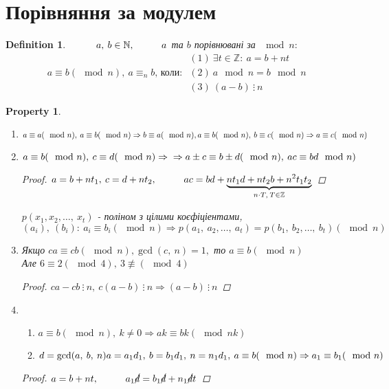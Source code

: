 \documentclass[a4paper,12pt]{bookest}
\newtheorem{definition}{Definition}[section]
\newtheorem*{property*}{Property}
\newcommand\tab[1][1cm]{\hspace*{#1}}
\begin{document}
\section{Порівняння за модулем}
\begin{definition}
	$\tab a,\>b\in\mathbb{N},\tab a$ та $b$ порівнювані за $\mod n:
	$
	$$a\equiv b(\mod n),\>a\equiv_nb\textrm{, коли: } \begin{array}{l}
		(1)\>\exists t\in\mathbb{Z}:\>a=b+nt \\
		(2)\>a\mod n=b\mod n\\
		(3)\>(a-b)\>\vdots\>n
	\end{array}$$
\end{definition}
\begin{property*}$ $
	\begin{enumerate}
		\item $a\equiv a(\mod n),\>a\equiv b(\mod n)\Rightarrow b\equiv a(\mod n),\\a\equiv b(\mod n),\> b\equiv c(\mod n)\Rightarrow a\equiv c(\mod n)$
		\item $a\equiv b(\mod n),\>c\equiv d(\mod n)\Rightarrow \\\Rightarrow a\pm c \equiv b\pm d(\mod n),\>ac\equiv bd\mod n)$\begin{proof}
			$a=b+nt_1,\> c=d+nt_2,\tab ac=bd +\underbrace{nt_1d+nt_2b+n^2t_1t_2}_{n\cdot T,\>T\in\mathbb{Z}}$
		\end{proof}
		$p(x_1,x_2,\dots,\>x_t)$ - поліном з цілими коєфіціентами,\\$(a_i),\>(b_i):\>a_i\equiv b_i(\mod n)\Rightarrow p(a_1,\>a_2,\dots,\>a_t)=p(b_1,\>b_2,\dots,\>b_t)(\mod n)$
		\item Якщо $ca\equiv cb(\mod n),\gcd (c,\>n)=1,$ то $a\equiv b(\mod n)$\\ Але $6\equiv 2(\mod 4),\>3\not\equiv (\mod 4)$\begin{proof}
			$ca-cb\>\vdots\>n,\>c(a-b)\>\vdots\>n\Rightarrow (a-b)\>\vdots\>n$
		\end{proof} 
		\item \begin{enumerate} 
		\item $a\equiv b(\mod n),\>k\ne 0\Rightarrow ak\equiv bk (\mod nk)$
		\item $d=\gcd (a,\>b,\>n)\\a=a_1d_1,\>b=b_1d_1,\>n=n_1d_1,\>a\equiv b(\mod n)\Rightarrow a_1\equiv b_1(\mod n)$\end{enumerate} \begin{proof}
			$a=b+nt,\tab a_1\cancel{d}=b_1\cancel{d}+n_1\cancel{d}t$

\end{proof}
\end{enumerate}
\end{property*}
\end{document}
